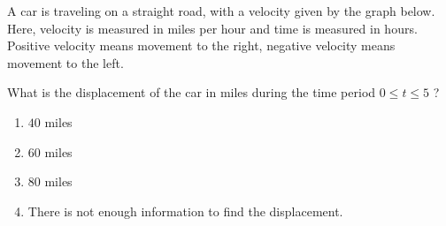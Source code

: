 \item A car is traveling on a straight road, with a velocity given by the graph below.  Here, velocity is measured in miles per hour and time is measured in hours.  Positive velocity means movement to the right, negative velocity means movement to the left.

What is the displacement of the car in miles during the time period $0 \leq t \leq 5$ ?



\begin{center}
	
\end{center}

\begin{multicols}{2}
	\begin{enumerate}
	\item $40$ miles %
	\item $60$ miles
	\item $80$ miles
	\item There is not enough information to find the displacement.
	\end{enumerate}
\end{multicols}
